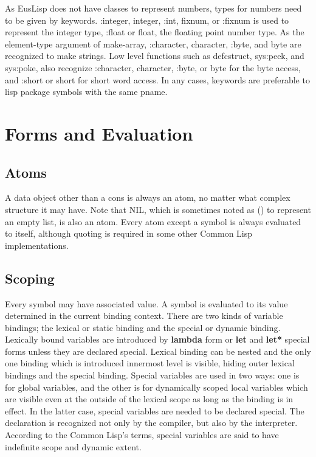 As EusLisp does not have classes to represent numbers,
types for numbers need to be given by keywords.
{\bfx :integer}, {\bfx integer}, {\bfx :int}, {\bfx fixnum},
or {\bfx :fixnum} is used to represent the integer type,
{\bfx :float} or {\bfx float}, the floating point number type.
As the {\emx element-type} argument of {\bfx make-array},
{\bfx :character}, {\bfx character}, {\bfx :byte}, and {\bfx byte}
are recognized to make strings.
Low level functions such as {\bfx defcstruct}, {\bfx sys:peek},
and {\bfx sys:poke}, also recognize
{\bfx :character}, {\bfx character}, {\bfx :byte}, or {\bfx byte}
for the byte access, and {\bfx :short} or {\bfx short} for short word access.
In any cases, keywords are preferable to lisp package symbols with the
same pname.

\newpage

\section{Forms and Evaluation}
\subsection{Atoms}

A data object other than a cons is always an atom, no matter what complex
structure it may have.
Note that NIL, which is sometimes noted as () to represent an empty
list, is also an atom.
Every atom except a symbol is always evaluated to itself,
although quoting is required in some other Common Lisp implementations.

\subsection{Scoping}

Every symbol may have associated value.
A symbol is evaluated to its value determined in the current binding context.
There are two kinds of variable bindings;
the lexical or static binding and the special or dynamic binding.
Lexically bound variables are introduced by {\bf lambda} form or
{\bf let} and {\bf let*} special forms
unless they are declared special.
Lexical binding can be nested and the only one binding which is introduced
innermost level is visible, hiding outer lexical bindings and the special 
binding.
Special variables are used in two ways:
one is for global variables, and the other is for dynamically scoped
local variables which are visible even at the outside of
the lexical scope as long as the binding is in effect.
In the latter case, special variables are needed to be declared special.
The declaration is recognized not only by the compiler, but also by
the interpreter.
According to the Common Lisp's terms, special variables are said to have
indefinite scope and dynamic extent.

